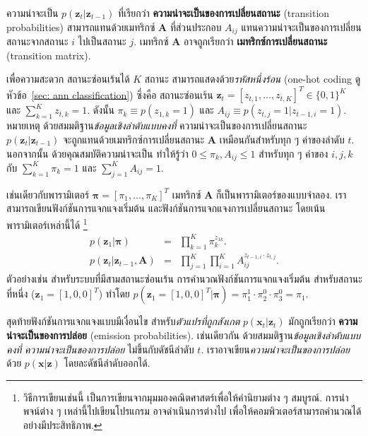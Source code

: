 ความน่าจะเป็น $p(\bm{z}_t|\bm{z}_{t-1})$ ที่เรียกว่า \textbf{ความน่าจะเป็นของการเปลี่ยนสถานะ} (transition probabilities)
สามารถแทนด้วยเมทริกซ์ $\bm{A}$ ที่ส่วนประกอบ $A_{ij}$ แทนความน่าจะเป็นของการเปลี่ยนสถานะจากสถานะ $i$ ไปเป็นสถานะ $j$.
เมทริกซ์ $\bm{A}$ อาจถูกเรียกว่า \textbf{เมทริกซ์การเปลี่ยนสถานะ} (transition matrix).

เพื่อความสะดวก สถานะซ่อนเร้นได้ $K$ สถานะ สามารถแสดงด้วย\textit{รหัสหนึ่งร้อน} (one-hot coding ดูหัวข้อ~\ref{sec: ann classification}) ซึ่งคือ สถานะซ่อนเร้น $\bm{z}_t = [z_{t,1}, \ldots, z_{t,K}]^T \in \{0,1\}^K$ และ $\sum_{k=1}^K z_{t,k} = 1$. 
ดังนั้น
$\pi_k \equiv p(z_{1,k} = 1)$
และ
$A_{ij} \equiv p(z_{t,j}=1|z_{t-1,i}=1)$.
หมายเหตุ ด้วยสมมติฐาน\textit{ข้อมูลเชิงลำดับแบบคงที่}
ความน่าจะเป็นของการเปลี่ยนสถานะ $p(\bm{z}_t|\bm{z}_{t-1})$
จะถูกแทนด้วยเมทริกซ์การเปลี่ยนสถานะ $\bm{A}$ เหมือนกันสำหรับทุก ๆ ค่าของลำดับ $t$.
นอกจากนั้น ด้วยคุณสมบัติความน่าจะเป็น
ทำให้รู้ว่า $0 \leq \pi_k, A_{ij} \leq 1$
สำหรับทุก ๆ ค่าของ $i, j, k$
กับ 
$\sum_{k=1}^K \pi_k = 1$ 
และ $\sum_{j=1}^K A_{ij} = 1$.

เช่นเดียวกับพารามิเตอร์ $\bm{\pi} = [\pi_1, \ldots, \pi_K]^T$
เมทริกซ์ $\bm{A}$ ก็เป็นพารามิเตอร์ของแบบจำลอง.
เราสามารถเขียนฟังก์ชันการแจกแจงเริ่มต้น และฟังก์ชันการแจกแจงการเปลี่ยนสถานะ โดยเน้นพารามิเตอร์เหล่านี้ได้%
\footnote{%
วิธีการเขียนเช่นนี้ เป็นการเขียนจากมุมมองคณิตศาสตร์เพื่อให้คำนิยามต่าง ๆ สมบูรณ์.
การนำพจน์ต่าง ๆ เหล่านี้ไปเขียนโปรแกรม อาจดำเนินการต่างไป เพื่อให้คอมพิวเตอร์สามารถคำนวณได้อย่างมีประสิทธิภาพ.
}
\begin{eqnarray}
p(\bm{z}_1|\bm{\pi}) &=& \prod_{k=1}^K \pi_k^{z_{1k}}
\label{eq: seq HMM p(z|pi)} . \\
p(\bm{z}_t|\bm{z}_{t-1}, \bm{A}) &=& \prod _{j=1}^K \prod_{i=1}^K A_{ij}^{z_{t-1,i} \cdot z_{t,j}} 
\label{eq: seq HMM p(z|z,A)} .
\end{eqnarray}
ตัวอย่างเช่น สำหรับระบบที่มีสามสถานะซ่อนเร้น
การคำนวณฟังก์ชันการแจกแจงเริ่มต้น สำหรับสถานะที่หนึ่ง ($\bm{z}_1 = [1,0,0]^T$)
ทำโดย
$p(\bm{z}_1 = [1,0,0]^T|\bm{\pi}) = \pi_1^1 \cdot \pi_2^0 \cdot \pi_3^0 = \pi_1$.

สุดท้ายฟังก์ชันการแจกแจงแบบมีเงื่อนไข สำหรับ\textit{ตัวแปรที่ถูกสังเกต}
$p(\bm{x}_t|\bm{z}_t)$ มักถูกเรียกว่า \textbf{ความน่าจะเป็นของการปล่อย} (emission  probabilities).
เช่นเดียวกัน ด้วยสมมติฐาน\textit{ข้อมูลเชิงลำดับแบบคงที่}
\textit{ความน่าจะเป็นของการปล่อย} ไม่ขึ้นกับดัชนีลำดับ $t$.
เราอาจเขียน\textit{ความน่าจะเป็นของการปล่อย}ด้วย $p(\bm{x}|\bm{z})$ โดยละดัชนีลำดับออกได้.

